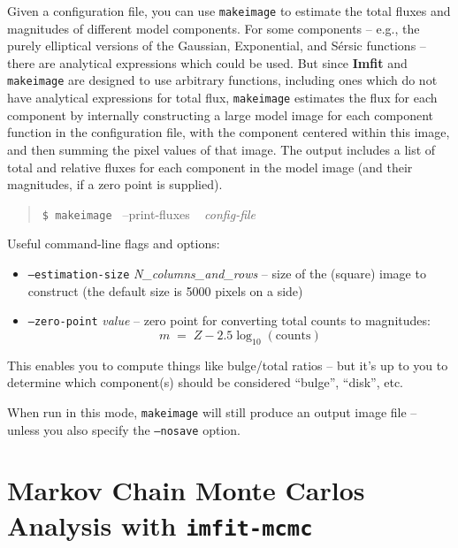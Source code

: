 \documentclass[10pt,a4paper,article]{memoir}
\newcommand{\imfit}{\textbf{Imfit}}
\newcommand{\imfitmcmc}{\texttt{imfit-mcmc}}
\newcommand{\makeimage}{\texttt{makeimage}}
\begin{document}
Given a configuration file, you can use \makeimage{} to estimate the total
fluxes and magnitudes of different model components. For some components --
e.g., the purely elliptical versions of the Gaussian, Exponential, and S\'{e}rsic
functions -- there are analytical expressions which could be used. But since
\imfit{} and \makeimage{} are designed to use arbitrary functions, including
ones which do not have analytical expressions for total flux, \makeimage{}
estimates the flux for each component by internally constructing a large model
image for each component function in the configuration file, with the
component centered within this image, and then summing the pixel values of that image. The
output includes a list of total and relative fluxes for each component in the
model image (and their magnitudes, if a zero point is supplied).


\begin{quote}
  \texttt{\$ \makeimage{} }  --print-fluxes ~ \textit{config-file}
\end{quote}

Useful command-line flags and options:
\begin{itemize}

\item \texttt{--estimation-size} \textit{N\_columns\_and\_rows} -- size of the
(square) image to construct (the default size is 5000 pixels on a side)

\item \texttt{--zero-point} \textit{value} -- zero point for converting total counts
to magnitudes:
\begin{equation}
m \; = \; Z - 2.5 \log_{10}( {\mathrm{counts}} )
\end{equation}

\end{itemize}

This enables you to compute things like bulge/total ratios -- but it's up to you
to determine which component(s) should be considered ``bulge'', ``disk'', etc.

When run in this mode, \makeimage{} will still produce an output image file --
unless you also specify the \texttt{--nosave} option.



\newpage

\chapter{Markov Chain Monte Carlos Analysis with \imfitmcmc}\label{sec:mcmc}
\end{document}
